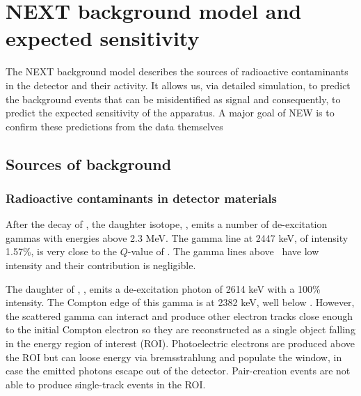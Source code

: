 
\section{NEXT background model and expected sensitivity}

The NEXT background model describes the sources of radioactive contaminants in the detector and their activity. It allows us, via detailed simulation, to predict the background events that can be misidentified as signal and consequently, to predict the expected
sensitivity of the apparatus. A major goal of NEW is to confirm these predictions from the data themselves

\subsection{Sources of background}

\subsubsection*{Radioactive contaminants in detector materials}

After the decay of \BI, the daughter isotope, \Po, emits a number of de-excitation gammas with energies above 2.3 MeV. The gamma line at 2447 keV, of intensity 1.57\%, is very close to the $Q$-value of \XE. The gamma lines above \Qbb\ have low intensity and their contribution is negligible. 

The daughter of \TL, \Pb, emits a de-excitation photon of 2614 keV with a 100\% intensity. The Compton edge of this gamma is at 2382 keV, well below \Qbb. However, the scattered gamma can interact and produce other electron tracks close enough to the initial Compton electron so they are reconstructed as a single object falling in the energy region of interest (ROI). Photoelectric electrons are produced above the ROI but can loose energy via bremsstrahlung and populate the window, in case the emitted photons escape out of the detector. Pair-creation events are not able to produce single-track events in the ROI. 

